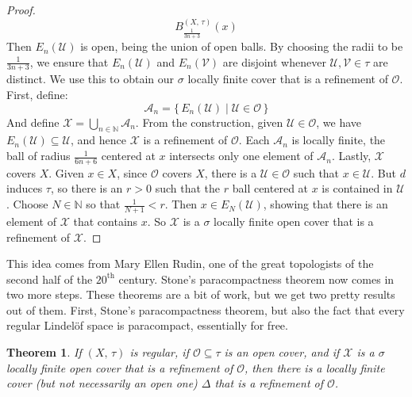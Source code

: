 \documentclass{article}
\theoremstyle{plain}
\newtheorem{theorem}{Theorem}[section]
\theoremstyle{normal}
\begin{document}
\begin{proof}
\begin{equation}
                B_{\frac{1}{3n+3}}^{(X,\,\tau)}(x)
            \end{equation}
            Then $E_{n}(\mathcal{U})$ is open, being the union of open balls.
            By choosing the radii to be $\frac{1}{3n+3}$, we ensure that
            $E_{n}(\mathcal{U})$ and $E_{n}(\mathcal{V})$ are disjoint
            whenever $\mathcal{U},\mathcal{V}\in\tau$ are distinct. We use
            this to obtain our $\sigma$ locally finite cover that is a
            refinement of $\mathcal{O}$. First, define:
            \begin{equation}
                \mathcal{A}_{n}=
                \{\,E_{n}(\mathcal{U})\;|\;\mathcal{U}\in\mathcal{O}\,\}
            \end{equation}
            And define $\mathcal{X}=\bigcup_{n\in\mathbb{N}}\mathcal{A}_{n}$.
            From the construction, given $\mathcal{U}\in\mathcal{O}$, we have
            $E_{n}(\mathcal{U})\subseteq\mathcal{U}$, and hence
            $\mathcal{X}$ is a refinement of $\mathcal{O}$. Each
            $\mathcal{A}_{n}$ is locally finite, the ball of radius
            $\frac{1}{6n+6}$ centered at $x$ intersects only one element of
            $\mathcal{A}_{n}$. Lastly, $\mathcal{X}$ covers $X$. Given
            $x\in{X}$, since $\mathcal{O}$ covers $X$, there is a
            $\mathcal{U}\in\mathcal{O}$ such that $x\in\mathcal{U}$. But
            $d$ induces $\tau$, so there is an $r>0$ such that
            the $r$ ball centered at $x$ is contained in $\mathcal{U}$. Choose
            $N\in\mathbb{N}$ so that $\frac{1}{N+1}<r$. Then
            $x\in{E}_{N}(\mathcal{U})$, showing that there is an element of
            $\mathcal{X}$ that contains $x$. So $\mathcal{X}$ is a
            $\sigma$ locally finite open cover that is a refinement of
            $\mathcal{X}$.
        \end{proof}
        This idea comes from Mary Ellen Rudin, one of the great topologists of
        the second half of the $20^{\textrm{th}}$ century. Stone's
        paracompactness theorem now comes in two more steps. These
        theorems are a bit of work, but we get two pretty results out of
        them. First, Stone's paracompactness theorem, but also the fact that
        every regular Lindel\"{o}f space is paracompact, essentially for free.
        \begin{theorem}
            If $(X,\,\tau)$ is regular, if $\mathcal{O}\subseteq\tau$ is an
            open cover, and if $\mathcal{X}$ is a $\sigma$ locally finite open
            cover that is a refinement of $\mathcal{O}$, then there is a
            locally finite cover (but not necessarily an open one)
            $\Delta$ that is a refinement of $\mathcal{O}$.
        \end{theorem}
\end{document}
